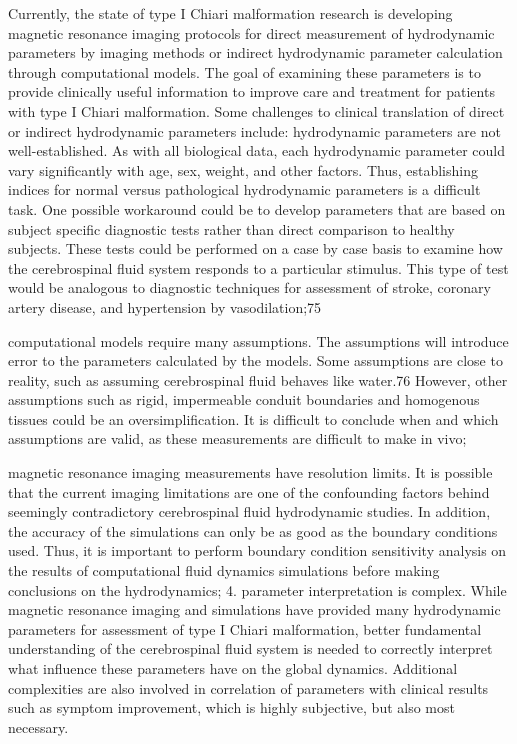 \documentclass{report}
\begin{document}
Currently, the state of type I Chiari malformation
research is developing magnetic resonance imaging
protocols for direct measurement of hydrodynamic
parameters by imaging methods or indirect hydrodynamic
parameter calculation through computational
models. The goal of examining these
parameters is to provide clinically useful information
to improve care and treatment for patients with type I
Chiari malformation. Some challenges to clinical
translation of direct or indirect hydrodynamic parameters
include:
hydrodynamic parameters are not well-established.
As with all biological data, each hydrodynamic
parameter could vary significantly with age, sex,
weight, and other factors. Thus, establishing indices
for normal versus pathological hydrodynamic
parameters is a difficult task. One possible workaround
could be to develop parameters that are
based on subject specific diagnostic tests rather
than direct comparison to healthy subjects. These
tests could be performed on a case by case basis to
examine how the cerebrospinal fluid system
responds to a particular stimulus. This type of test
would be analogous to diagnostic techniques for
assessment of stroke, coronary artery disease, and
hypertension by vasodilation;75

computational models require many assumptions.
The assumptions will introduce error to the
parameters calculated by the models. Some
assumptions are close to reality, such as assuming
cerebrospinal fluid behaves like water.76 However,
other assumptions such as rigid, impermeable
conduit boundaries and homogenous tissues could
be an oversimplification. It is difficult to conclude
when and which assumptions are valid, as these
measurements are difficult to make in vivo;

magnetic resonance imaging measurements have
resolution limits. It is possible that the current
imaging limitations are one of the confounding
factors behind seemingly contradictory cerebrospinal
fluid hydrodynamic studies. In addition, the
accuracy of the simulations can only be as good as
the boundary conditions used. Thus, it is important
to perform boundary condition sensitivity analysis
on the results of computational fluid dynamics
simulations before making conclusions on the
hydrodynamics;
4. parameter interpretation is complex. While magnetic
resonance imaging and simulations have
provided many hydrodynamic parameters for
assessment of type I Chiari malformation, better
fundamental understanding of the cerebrospinal
fluid system is needed to correctly interpret what
influence these parameters have on the global
dynamics. Additional complexities are also
involved in correlation of parameters with clinical
results such as symptom improvement, which is
highly subjective, but also most necessary.
\end{document}
